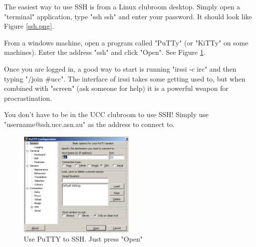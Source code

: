 The easiest way to use SSH is from a Linux clubroom desktop. Simply open a "terminal" application, type "ssh ssh" and enter your password. It should look like Figure \ref{ssh.png}.

From a windows machine, open a program called "PuTTy" (or "KiTTy" on some machines). Enter the address "ssh" and click "Open". See Figure \ref{putty.png}.

Once you are logged in, a good way to start is running "irssi -c irc" and then typing "/join \#ucc". The interface of irssi takes some getting used to, but when combined with "screen" (ask someone for help) it is a powerful weapon for procrastination.

You don't have to be in the UCC clubroom to use SSH! Simply use "username@ssh.ucc.asn.au" as the address to connect to.


\begin{figure}[H]
	\centering
	\includegraphics[width=0.5\textwidth]{figures/putty.png}
	\caption{Use PuTTY to SSH. Just press "Open"} 
	\label{putty.png}
\end{figure}


